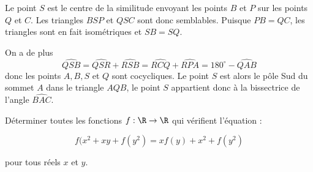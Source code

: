 \begin{sol}
\begin{center}
\end{center}

Le point $S$ est le centre de la similitude envoyant les points $B$ et $P$ sur les points $Q$ et $C$. Les triangles $BSP$ et $QSC$ sont donc semblables. Puisque $PB=QC$, les triangles sont en fait isométriques et $SB=SQ$.

On a de plus
$$\widehat{QSB}=\widehat{QSR}+\widehat{RSB}=\widehat{RCQ}+\widehat{RPA}=180^\circ-\widehat{QAB}$$
donc les points $A,B, S$ et $Q$ sont cocycliques. Le point $S$ est alors le pôle Sud du sommet $A$ dans le triangle $AQB$, le point $S$ appartient donc à la bissectrice de l'angle $\widehat{BAC}$. 
\end{sol}


\begin{exo}
Déterminer toutes les fonctions $f : \R \rightarrow \R$ qui vérifient l'équation :

\[f(x^2+xy+f(y^2)=xf(y)+x^2+f(y^2)\]

pour tous réels $x$ et $y$. 
\end{exo}

